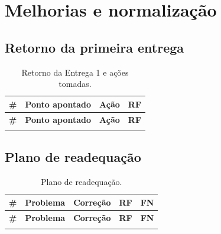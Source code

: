 \documentclass[12pt,a4paper]{article}
\begin{document}
\section{Melhorias e normalização}\label{sec:melhorias}

\subsection{Retorno da primeira entrega}\label{sec:feedback}

{\small
\setlength{\tabcolsep}{4pt}
\begin{longtable}{>{\raggedright\arraybackslash}p{0.7cm}
                  >{\raggedright\arraybackslash}p{4.6cm}
                  >{\raggedright\arraybackslash}p{6.0cm}
                  >{\raggedright\arraybackslash}p{2.0cm}}
\caption{Retorno da Entrega 1 e ações tomadas.}\label{tab:feedback}\\
\toprule
\textbf{\#} & \textbf{Ponto apontado} & \textbf{Ação} & \textbf{RF}\\
\midrule
\endfirsthead
\toprule
\textbf{\#} & \textbf{Ponto apontado} & \textbf{Ação} & \textbf{RF}\\
\midrule
\endhead
\bottomrule
\endfoot
 & & & \\
\end{longtable}
}

\subsection{Plano de readequação}\label{sec:plano}

{\small
\setlength{\tabcolsep}{4pt}
\begin{longtable}{>{\raggedright\arraybackslash}p{0.7cm}
                  >{\raggedright\arraybackslash}p{4.0cm}
                  >{\raggedright\arraybackslash}p{5.4cm}
                  >{\raggedright\arraybackslash}p{1.6cm}
                  >{\raggedright\arraybackslash}p{1.4cm}}
\caption{Plano de readequação.}\label{tab:readequacao}\\
\toprule
\textbf{\#} & \textbf{Problema} & \textbf{Correção} & \textbf{RF} & \textbf{FN}\\
\midrule
\endfirsthead
\toprule
\textbf{\#} & \textbf{Problema} & \textbf{Correção} & \textbf{RF} & \textbf{FN}\\
\midrule
\endhead
\bottomrule
\endfoot
 & & & & \\
\end{longtable}
}
\end{document}
